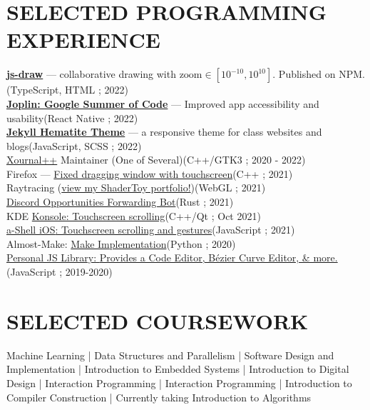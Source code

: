 \documentclass[12pt,letterpaper]{extarticle}
\begin{document}
  \section{SELECTED PROGRAMMING EXPERIENCE}
  \newcommand\prExpEntry[3]{\textrm{#1}\hfill \small(#2 ; #3) \\}
  \prExpEntry{\textbf{\href{https://www.npmjs.com/package/js-draw}{js-draw}} — \footnotesize collaborative drawing with $\textrm{zoom} \in [10^{-10}, 10^{10}]$. Published on NPM.}{TypeScript, HTML}{2022}
  \prExpEntry{\textbf{\href{https://henry-heino.web.app/2022/09/05/gsoc-final-reflection/}{Joplin: Google Summer of Code}} — \footnotesize Improved app accessibility and usability}{\small React Native}{2022}
  \prExpEntry{\textbf{\href{https://personalizedrefrigerator.github.io/jekyll-hematite-theme/}{Jekyll Hematite Theme}} — \footnotesize a responsive theme for class websites and blogs}{\small JavaScript, SCSS }{2022}
  \prExpEntry{\href{https://github.com/xournalpp/xournalpp}{Xournal++} Maintainer (One of Several)}{C++/GTK3}{2020 - 2022}
  \prExpEntry{Firefox --- \href{https://phabricator.services.mozilla.com/D129349}{Fixed dragging window with touchscreen}}{C++}{2021}
  \prExpEntry{Raytracing (\href{https://shadertoy.com/user/personalizedrefrigerator}{view my ShaderToy portfolio!})}{WebGL}{2021}
  \prExpEntry{\href{https://github.com/UWAppDev/opportunities-forwarding-bot}{Discord Opportunities Forwarding Bot}}{Rust}{2021}
  \prExpEntry{KDE \href{https://invent.kde.org/utilities/konsole/-/merge_requests/516}{Konsole: Touchscreen scrolling}}{C++/Qt}{Oct 2021}
  \prExpEntry{\href{https://github.com/holzschu/a-shell/pull/246}{{a-Shell iOS}: Touchscreen scrolling and gestures}}{JavaScript}{2021}
  \prExpEntry{Almost-Make: \href{https://github.com/personalizedrefrigerator/AlmostMake}{Make Implementation}}{Python}{2020}
  \prExpEntry{\href{https://github.com/personalizedrefrigerator/LibJS}{{\footnotesize Personal JS Library:} {\small Provides a Code Editor, Bézier Curve Editor, \& more.}}}{JavaScript}{2019-2020}

  \section{SELECTED COURSEWORK}
  \begin{addmargin}[2em]{2em}
    \def\cseRf#1#2{{#2}}
    \def\cseSp{ | }
    \small

    \cseRf{446}{Machine Learning}
    \cseSp{}\cseRf{332}{Data Structures and Parallelism}
    \cseSp{}\cseRf{331}{Software Design and Implementation}
    \cseSp{}\cseRf{474}{Introduction to Embedded Systems}
    \cseSp{}\cseRf{369}{Introduction to Digital Design}
    \cseSp{}\cseRf{340}{Interaction Programming}
    \cseSp{}\cseRf{340}{Interaction Programming}
    \cseSp{}\cseRf{401}{Introduction to Compiler Construction}
    \cseSp{} Currently taking \cseRf{421}{Introduction to Algorithms}
  \end{addmargin}
\end{document}

